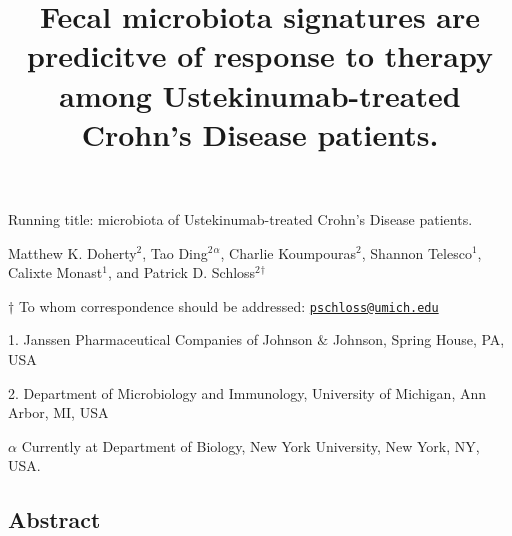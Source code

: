 \documentclass[11pt,]{article}
\title{Fecal microbiota signatures are predicitve of response to therapy among
Ustekinumab-treated Crohn's Disease patients.}
\author{}
\date{}
\begin{document}
\maketitle

\vspace{35mm}

Running title: microbiota of Ustekinumab-treated Crohn's Disease
patients.

\vspace{35mm} Matthew K. Doherty\({^2}\), Tao Ding\({^2}\)\({^\alpha}\),
Charlie Koumpouras\({^2}\), Shannon Telesco\({^1}\), Calixte
Monast\({^1}\), and Patrick D. Schloss\({^2}\)\({^\dagger}\)

\(\dagger\) To whom correspondence should be addressed:
\href{mailto:pschloss@umich.edu}{\nolinkurl{pschloss@umich.edu}}

1. Janssen Pharmaceutical Companies of Johnson \({\&}\) Johnson, Spring
House, PA, USA

2. Department of Microbiology and Immunology, University of Michigan,
Ann Arbor, MI, USA

\({\alpha}\) Currently at Department of Biology, New York University,
New York, NY, USA.

\newpage

\subsection{Abstract}\label{abstract}
\end{document}
